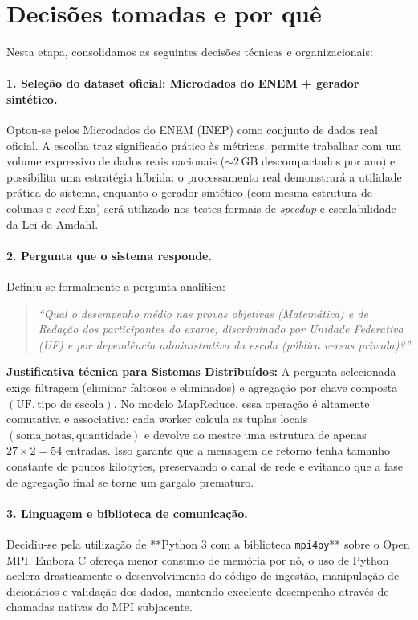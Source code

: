 \section{Decisões tomadas e por quê}

Nesta etapa, consolidamos as seguintes decisões técnicas e organizacionais:

\paragraph{1. Seleção do dataset oficial: Microdados do ENEM + gerador sintético.}
Optou-se pelos Microdados do ENEM (INEP) como conjunto de dados real oficial. A
escolha traz significado prático às métricas, permite trabalhar com um volume
expressivo de dados reais nacionais ($\sim 2$\,GB descompactados por ano) e
possibilita uma estratégia híbrida: o processamento real demonstrará a
utilidade prática do sistema, enquanto o gerador sintético (com mesma estrutura
de colunas e \emph{seed} fixa) será utilizado nos testes formais de \emph{speedup}
e escalabilidade da Lei de Amdahl.

\paragraph{2. Pergunta que o sistema responde.}
Definiu-se formalmente a pergunta analítica:
\begin{quote}
  \emph{``Qual o desempenho médio nas provas objetivas (Matemática) e de Redação
  dos participantes do exame, discriminado por Unidade Federativa (UF) e por
  dependência administrativa da escola (pública versus privada)?''}
\end{quote}
\textbf{Justificativa técnica para Sistemas Distribuídos:}
A pergunta selecionada exige filtragem (eliminar faltosos e eliminados) e
agregação por chave composta $(\text{UF}, \text{tipo de escola})$. No modelo
MapReduce, essa operação é altamente comutativa e associativa: cada worker
calcula as tuplas locais $(\text{soma\_notas}, \text{quantidade})$ e devolve ao
mestre uma estrutura de apenas $27 \times 2 = 54$ entradas. Isso garante que a
mensagem de retorno tenha tamanho constante de poucos kilobytes, preservando o
canal de rede e evitando que a fase de agregação final se torne um gargalo
prematuro.

\paragraph{3. Linguagem e biblioteca de comunicação.}
Decidiu-se pela utilização de **Python 3 com a biblioteca \texttt{mpi4py}** sobre
o Open MPI. Embora C ofereça menor consumo de memória por nó, o uso de Python
acelera drasticamente o desenvolvimento do código de ingestão, manipulação de
dicionários e validação dos dados, mantendo excelente desempenho através de
chamadas nativas do MPI subjacente.

